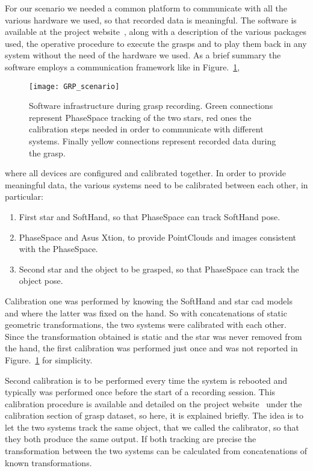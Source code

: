 For our scenario we needed a common platform to communicate with all the various hardware we used, so that recorded data is meaningful.
The software is available at the project website~\cite{website:pacman:dataset}, along with a description of the various packages used, the operative procedure to execute the grasps
and to play them back in any system without the need of the hardware we used. 
As a brief summary the software employs a communication framework like in Figure.~\ref{fig:grasp:software}, 
\begin{figure}[bt!]
  \centering
  \texttt{[image: GRP\_scenario]}
  \caption{Software infrastructure during grasp recording. Green connections represent PhaseSpace tracking of the two stars, red ones the calibration steps needed in order to communicate with different systems. Finally yellow connections represent recorded data during the grasp.}
  \label{fig:grasp:software}
\end{figure}
where all devices are configured and calibrated together. In order to provide meaningful data, the various systems need to be calibrated between each other, in particular: 
\begin{enumerate}
  \item First star and SoftHand, so that PhaseSpace can track SoftHand pose.
  \item PhaseSpace and Asus Xtion, to provide PointClouds and images consistent with the PhaseSpace.
  \item Second star and the object to be grasped, so that PhaseSpace can track the object pose.
\end{enumerate}

Calibration one was performed by knowing the SoftHand and star cad models and where the latter was fixed on the hand. So with concatenations of static geometric transformations, the two systems were calibrated with each other.
Since the transformation obtained is static and the star was never removed from the hand, the first calibration was performed just once and was not reported in Figure.~\ref{fig:grasp:software} for simplicity.

Second calibration is to be performed every time the system is rebooted and typically was performed once before the start of a recording session. 
This calibration procedure is available and detailed on the project website~\cite{website:pacman:dataset} under the calibration section of grasp dataset, so here, it is explained briefly.
The idea is to let the two systems track the same object, that we called the calibrator, so that they both produce the same output. If both tracking are precise the transformation between the two systems can be calculated
from concatenations of known transformations.

